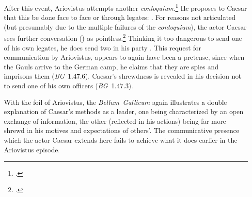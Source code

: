 \documentclass[12pt,letterpaper,oneside,final]{memoir}
\begin{document}
After this event, Ariovistus attempts another \emph{conloquium}.\footnote{.} He proposes to Caesar that this be done face to face or through legates: . For reasons not articulated (but presumably due to the multiple failures of the \emph{conloquium}), the actor Caesar sees further conversation () as pointless.\footnote{.} Thinking it too dangerous to send one of his own legates, he does send two in his party . This request for communication by Ariovistus, appears to again have been a pretense, since when the Gauls arrive to the German camp, he claims that they are spies and imprisons them (\emph{BG}~1.47.6). Caesar's shrewdness is revealed in his decision not to send one of his own officers (\emph{BG}~1.47.3).

With the foil of Ariovistus, the \emph{Bellum~Gallicum} again illustrates a double explanation of Caesar's methods as a leader, one being characterized by an open exchange of information, the other (reflected in his actions) being far more shrewd in his motives and expectations of others'. The communicative presence which the actor Caesar extends here fails to achieve what it does earlier in the Ariovistus episode.
\end{document}

